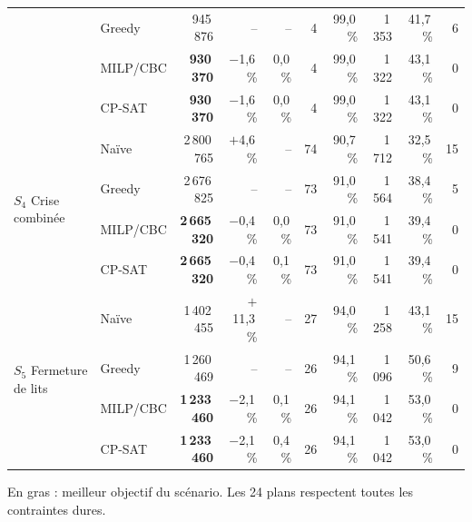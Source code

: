 \begin{table}[H]
{\begin{tabular}{llrrrrrrrr}
         & Greedy & 945\,876 & -- & -- & 4 & 99{,}0\,\% & 1\,353 & 41{,}7\,\% & 6 \\
         & MILP/CBC & \textbf{930\,370} & $-$1{,}6\,\% & 0{,}0\,\% & 4 & 99{,}0\,\% & 1\,322 & 43{,}1\,\% & 0 \\
         & CP-SAT & \textbf{930\,370} & $-$1{,}6\,\% & 0{,}0\,\% & 4 & 99{,}0\,\% & 1\,322 & 43{,}1\,\% & 0 \\
        \midrule
        \multirow{4}{*}{$S_4$ Crise combinée} & Naïve & 2\,800\,765 & $+$4{,}6\,\% & -- & 74 & 90{,}7\,\% & 1\,712 & 32{,}5\,\% & 15 \\
         & Greedy & 2\,676\,825 & -- & -- & 73 & 91{,}0\,\% & 1\,564 & 38{,}4\,\% & 5 \\
         & MILP/CBC & \textbf{2\,665\,320} & $-$0{,}4\,\% & 0{,}0\,\% & 73 & 91{,}0\,\% & 1\,541 & 39{,}4\,\% & 0 \\
         & CP-SAT & \textbf{2\,665\,320} & $-$0{,}4\,\% & 0{,}1\,\% & 73 & 91{,}0\,\% & 1\,541 & 39{,}4\,\% & 0 \\
        \midrule
        \multirow{4}{*}{$S_5$ Fermeture de lits} & Naïve & 1\,402\,455 & $+$11{,}3\,\% & -- & 27 & 94{,}0\,\% & 1\,258 & 43{,}1\,\% & 15 \\
         & Greedy & 1\,260\,469 & -- & -- & 26 & 94{,}1\,\% & 1\,096 & 50{,}6\,\% & 9 \\
         & MILP/CBC & \textbf{1\,233\,460} & $-$2{,}1\,\% & 0{,}1\,\% & 26 & 94{,}1\,\% & 1\,042 & 53{,}0\,\% & 0 \\
         & CP-SAT & \textbf{1\,233\,460} & $-$2{,}1\,\% & 0{,}4\,\% & 26 & 94{,}1\,\% & 1\,042 & 53{,}0\,\% & 0 \\
        \bottomrule
    \end{tabular}}
    \par\vspace{3pt}
    {\footnotesize En gras : meilleur objectif du scénario. Les 24 plans respectent toutes les contraintes dures.}
\end{table}
